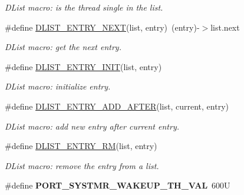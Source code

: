 \begin{DoxyCompactItemize}
\begin{DoxyCompactList}\small\item\em D\-List macro\-: is the thread single in the list. \end{DoxyCompactList}\item 
\#define \hyperlink{group__kern__impl_gab4b1b58e436cff32fc080493dfa35619}{D\-L\-I\-S\-T\-\_\-\-E\-N\-T\-R\-Y\-\_\-\-N\-E\-X\-T}(list, entry)~(entry)-\/$>$list.\-next
\begin{DoxyCompactList}\small\item\em D\-List macro\-: get the next entry. \end{DoxyCompactList}\item 
\#define \hyperlink{group__kern__impl_ga23a7667839eb576ddc4f55f2fcf77d65}{D\-L\-I\-S\-T\-\_\-\-E\-N\-T\-R\-Y\-\_\-\-I\-N\-I\-T}(list, entry)
\begin{DoxyCompactList}\small\item\em D\-List macro\-: initialize entry. \end{DoxyCompactList}\item 
\#define \hyperlink{group__kern__impl_gaff514b213c2cd3ad388fd5479275834f}{D\-L\-I\-S\-T\-\_\-\-E\-N\-T\-R\-Y\-\_\-\-A\-D\-D\-\_\-\-A\-F\-T\-E\-R}(list, current, entry)
\begin{DoxyCompactList}\small\item\em D\-List macro\-: add new {\ttfamily entry} after {\ttfamily current} entry. \end{DoxyCompactList}\item 
\#define \hyperlink{group__kern__impl_ga4a663d16206e95f1084af0a44e8518a0}{D\-L\-I\-S\-T\-\_\-\-E\-N\-T\-R\-Y\-\_\-\-R\-M}(list, entry)
\begin{DoxyCompactList}\small\item\em D\-List macro\-: remove the {\ttfamily entry} from a list. \end{DoxyCompactList}\item 
\hypertarget{group__kern__impl_ga4f1186117e99083012e835fb31b9f7a2}{\#define {\bfseries P\-O\-R\-T\-\_\-\-S\-Y\-S\-T\-M\-R\-\_\-\-W\-A\-K\-E\-U\-P\-\_\-\-T\-H\-\_\-\-V\-A\-L}~600\-U}\label{group__kern__impl_ga4f1186117e99083012e835fb31b9f7a2}

\end{DoxyCompactItemize}

